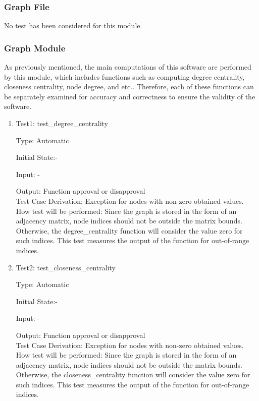 \documentclass[12pt, titlepage]{article}
\begin{document}
\subsubsection{Graph File}
No test has been considered for this module.
\subsubsection{Graph Module}

As previously mentioned, the main computations of this software are performed by this module, which includes functions such as computing degree centrality, closeness centrality, node degree, and etc.. Therefore, each of these functions can be separately examined for accuracy and correctness to ensure the validity of the software.

\begin{enumerate}

\item{Test1: test\_degree\_centrality}

Type: Automatic
					
Initial State:-
					
Input: -
					
Output: Function approval or disapproval\\
Test Case Derivation: Exception for nodes with non-zero obtained values.\\
How test will be performed: Since the graph is stored in the form of an adjacency matrix, node indices should not be outside the matrix bounds. Otherwise, the {degree\_centrality}  function will consider the value zero for such indices. This test measures the output of the function for out-of-range indices.
					
\item{Test2: test\_closeness\_centrality}

Type: Automatic
					
Initial State:-
					
Input: -
					
Output: Function approval or disapproval\\
Test Case Derivation: Exception for nodes with non-zero obtained values.\\
How test will be performed: Since the graph is stored in the form of an adjacency matrix, node indices should not be outside the matrix bounds. Otherwise, the {closeness\_centrality} function will consider the value zero for such indices. This test measures the output of the function for out-of-range indices.
					


\end{enumerate}
\end{document}
